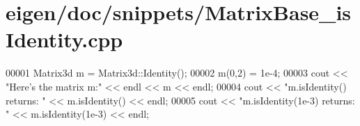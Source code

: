 \hypertarget{eigen_2doc_2snippets_2_matrix_base__is_identity_8cpp_source}{}\section{eigen/doc/snippets/\+Matrix\+Base\+\_\+is\+Identity.cpp}
\label{eigen_2doc_2snippets_2_matrix_base__is_identity_8cpp_source}

\begin{DoxyCode}
00001 Matrix3d m = Matrix3d::Identity();
00002 m(0,2) = 1e-4;
00003 cout << \textcolor{stringliteral}{"Here's the matrix m:"} << endl << m << endl;
00004 cout << \textcolor{stringliteral}{"m.isIdentity() returns: "} << m.isIdentity() << endl;
00005 cout << \textcolor{stringliteral}{"m.isIdentity(1e-3) returns: "} << m.isIdentity(1e-3) << endl;
\end{DoxyCode}
